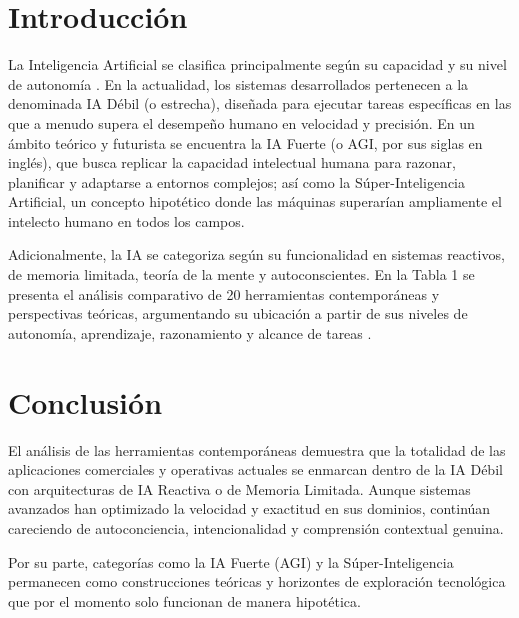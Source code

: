 \documentclass[11pt,letterpaper]{article}
\begin{document}
\portada
\indicegeneral


\section{Introducción}

La Inteligencia Artificial se clasifica principalmente según su capacidad y su nivel de autonomía \parencite{iae_u1_diseno}. En la actualidad, los sistemas desarrollados pertenecen a la denominada IA Débil (o estrecha), diseñada para ejecutar tareas específicas en las que a menudo supera el desempeño humano en velocidad y precisión. En un ámbito teórico y futurista se encuentra la IA Fuerte (o AGI, por sus siglas en inglés), que busca replicar la capacidad intelectual humana para razonar, planificar y adaptarse a entornos complejos; así como la Súper-Inteligencia Artificial, un concepto hipotético donde las máquinas superarían ampliamente el intelecto humano en todos los campos.

Adicionalmente, la IA se categoriza según su funcionalidad \parencite{iae_u1_diseno} en sistemas reactivos, de memoria limitada, teoría de la mente y autoconscientes. En la Tabla 1 se presenta el análisis comparativo de 20 herramientas contemporáneas y perspectivas teóricas, argumentando su ubicación a partir de sus niveles de autonomía, aprendizaje, razonamiento y alcance de tareas \parencite{iae_u1_cuaderno}.



\section{Conclusión}

El análisis de las herramientas contemporáneas demuestra que la totalidad de las aplicaciones comerciales y operativas actuales se enmarcan dentro de la IA Débil con arquitecturas de IA Reactiva o de Memoria Limitada. Aunque sistemas avanzados han optimizado la velocidad y exactitud en sus dominios, continúan careciendo de autoconciencia, intencionalidad y comprensión contextual genuina.

Por su parte, categorías como la IA Fuerte (AGI) y la Súper-Inteligencia permanecen como construcciones teóricas y horizontes de exploración tecnológica  que por el momento solo funcionan de manera hipotética.

\end{document}
